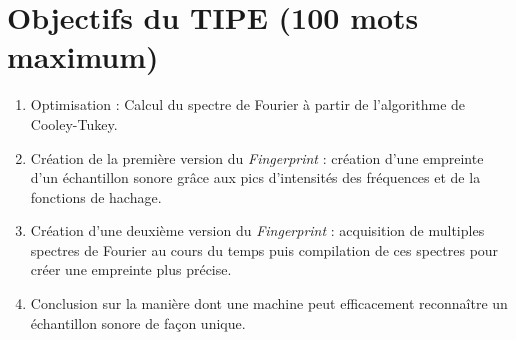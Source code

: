 \documentclass[12pt,a4paper]{article}
\begin{document}
\section*{Objectifs du TIPE (100 mots maximum)}
\begin{enumerate}
	\item	Optimisation : Calcul du spectre de Fourier à partir de l'algorithme de Cooley-Tukey.    %
    \item Création de la première version du \textit{Fingerprint} : création d'une empreinte d'un échantillon sonore grâce aux pics d'intensités des fréquences et de la fonctions de hachage.
    \item Création d'une deuxième version du \textit{Fingerprint} : acquisition de multiples spectres de Fourier  au cours du temps puis compilation de ces spectres pour créer une empreinte plus précise.
    \item Conclusion sur la manière dont une machine peut efficacement reconnaître un échantillon sonore de façon unique.
\end{enumerate}
\end{document}
